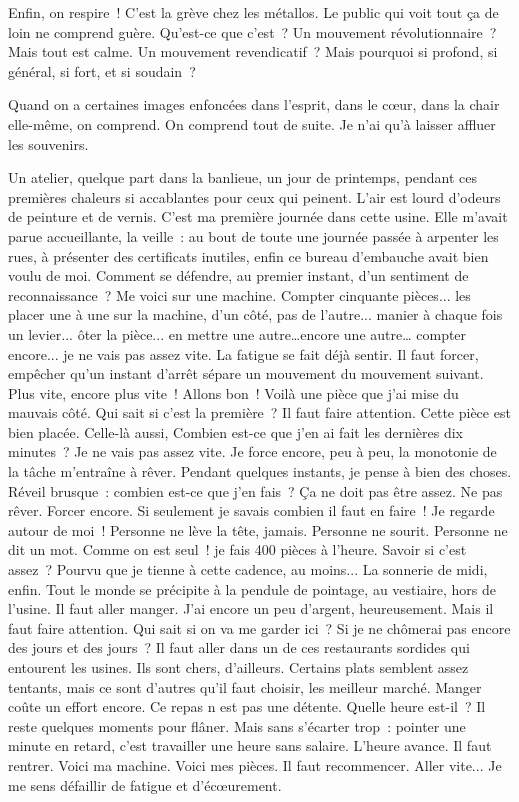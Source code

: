 \documentclass[french,twoside]{book} %
\begin{document}
\noindent \par
Enfin, on respire ! C'est la grève chez les métallos. Le public qui voit tout ça de loin ne comprend guère. Qu'est-ce que c'est ? Un mouvement révolutionnaire ? Mais tout est calme. Un mouvement revendicatif ? Mais pourquoi si profond, si général, si fort, et si soudain ?\par
Quand on a certaines images enfoncées dans l'esprit, dans le cœur, dans la chair elle-même, on comprend. On comprend tout de suite. Je n'ai qu'à laisser affluer les souvenirs.\par
Un atelier, quelque part dans la banlieue, un jour de printemps, pendant ces premières chaleurs si accablantes pour ceux qui peinent. L'air est lourd d'odeurs de peinture et de vernis. C'est ma première journée dans cette usine. Elle m'avait parue accueillante, la veille : au bout de toute une journée passée à arpenter les rues, à présenter des certificats inutiles, enfin ce bureau d'embauche avait bien voulu de moi. Comment se défendre, au premier instant, d'un sentiment de reconnaissance ? Me voici sur une machine. Compter cinquante pièces... les placer une à une sur la machine, d'un côté, pas de l'autre... manier à chaque fois un levier... ôter la pièce... en mettre une autre…encore une autre… compter encore... je ne vais pas assez vite. La fatigue se fait déjà sentir. Il faut forcer, empêcher qu'un instant d'arrêt sépare un mouvement du mouvement suivant. Plus vite, encore plus vite ! Allons bon ! Voilà une pièce que j'ai mise du mauvais côté. Qui sait si c'est la première ? Il faut faire attention. Cette pièce est bien placée. Celle-là aussi, Combien est-ce que j'en ai fait les dernières dix minutes ? Je ne vais pas assez vite. Je force encore, peu à peu, la monotonie de la tâche m'entraîne à rêver. Pendant quelques instants, je pense à bien des choses. Réveil brusque : combien est-ce que j'en fais ? Ça ne doit pas être assez. Ne pas rêver. Forcer encore. Si seulement je savais combien il faut en faire ! Je regarde autour de moi ! Personne ne lève la tête, jamais. Personne ne sourit. Personne ne dit un mot. Comme on est seul ! je fais 400 pièces à l'heure. Savoir si c'est assez ? Pourvu que je tienne à cette cadence, au moins... La sonnerie de midi, enfin. Tout le monde se précipite à la pendule de pointage, au vestiaire, hors de l'usine. Il faut aller manger. J'ai encore un peu d'argent, heureusement. Mais il faut faire attention. Qui sait si on va me garder ici ? Si je ne chômerai pas encore des jours et des jours ? Il faut aller dans un de ces restaurants sordides qui entourent les usines. Ils sont chers, d'ailleurs. Certains plats semblent assez tentants, mais ce sont d'autres qu’il faut choisir, les meilleur marché. Manger coûte un effort encore. Ce repas n est pas une détente. Quelle heure est-il ? Il reste quelques moments pour flâner. Mais sans s'écarter trop : pointer une minute en retard, c'est travailler une heure sans salaire. L'heure avance. Il faut rentrer. Voici ma machine. Voici mes pièces. Il faut recommencer. Aller vite... Je me sens défaillir de fatigue et d'écœurement. 
\end{document}
